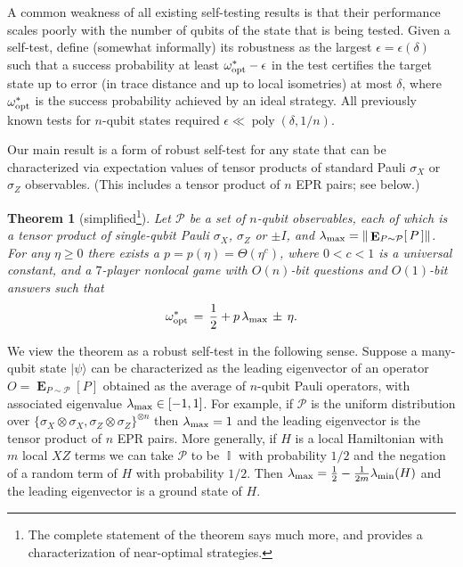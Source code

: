 \documentclass[11pt,letterpaper]{article}
\newcommand{\<}{\langle}
\renewcommand{\>}{\rangle}
\newtheorem{theorem}{Theorem}
\newcommand{\ket}[1]{| #1 \>}
\newcommand{\eps}{\epsilon}
\DeclareMathOperator{\E}{\mathbf{E}}
\DeclareMathOperator{\Id}{\mathbb{I}}
\DeclareMathOperator{\poly}{poly}
\begin{document}
A common weakness of all existing self-testing results is that their
performance scales poorly with the number of qubits of the state that
is being tested. Given a self-test, define (somewhat informally) its
robustness as the largest $\eps=\eps(\delta)$ such that a success
probability at least $\omega^*_{\rm opt}-\eps$ in the test certifies the
target state up to error (in trace distance and up to local isometries) at most $\delta$, where
$\omega^*_{\rm opt}$ is the success probability achieved by an ideal
strategy. All previously known tests for $n$-qubit states required
$\eps \ll \poly(\delta,1/n)$.%

Our main result is a form of robust self-test for {any} state that can
be characterized via expectation values of tensor products of standard Pauli
$\sigma_X$ or $\sigma_Z$ observables. (This includes a tensor product of $n$ EPR pairs; see below.)

\begin{theorem}[simplified\footnote{The complete statement of
the theorem says much more, and provides a characterization of near-optimal strategies.}]\label{thm:main_informal}
  Let $\mathcal{P}$ be a set of $n$-qubit observables, each of
  which is a tensor product of single-qubit Pauli $\sigma_X$, $\sigma_Z$ or
  $\pm I$, and $\lambda_{\rm max} = \| \E_{P \sim \mathcal{P}} [\, P\,]\|$.  For any $\eta \geq 0$ there exists a
  $p = p(\eta)=\Theta(\eta^c)$, where $0<c<1$ is a universal constant,
  and a $7$-player nonlocal game with $O(n)$-bit questions and
  $O(1)$-bit answers such that
	$$\omega^*_{\rm opt}\,
 =\, \frac{1}{2} + p\, \lambda_{\rm max}\,\pm\, \eta.$$
\end{theorem}

We view the theorem as a robust self-test in the following
sense. Suppose a many-qubit state $\ket{\psi}$ can be characterized as
the leading eigenvector of an operator $O=\E_{P \sim \mathcal{P}} [P]$
obtained as the average of $n$-qubit Pauli operators, with associated
eigenvalue $\lambda_{\rm max}\in[-1,1]$. For example, if $\mathcal{P}$
is the uniform distribution over
$\{\sigma_X \otimes \sigma_X,\sigma_Z\otimes\sigma_Z\}^{\otimes n}$
then $\lambda_{\rm \max}=1$ and the leading eigenvector is the tensor
product of $n$ EPR pairs. More generally, if $H$ is a local
Hamiltonian with $m$ local $XZ$ terms we can take $\mathcal{P}$ to be
$\Id$ with probability $1/2$ and the negation of a random term of $H$
with probability $1/2$. Then
$\lambda_{\rm max} = \frac{1}{2}-\frac{1}{2m}\lambda_{\rm min}(H)$ and
the leading eigenvector is a ground state of $H$.
\end{document}

